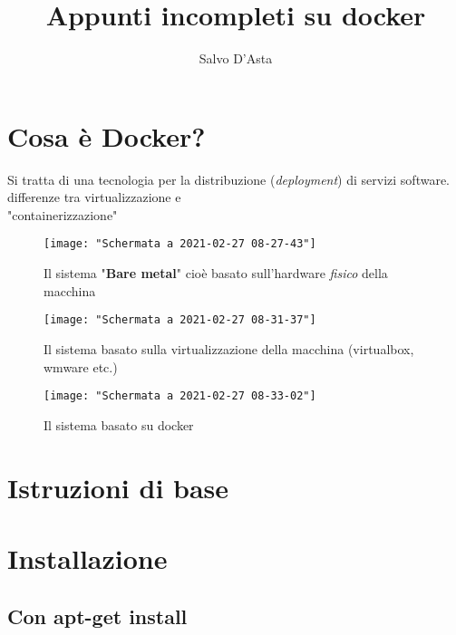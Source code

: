 \documentclass[10pt,a4paper]{report}
\author{Salvo D'Asta}
\title{Appunti incompleti su docker}
\begin{document}
	

	
	\maketitle
	
	


\tableofcontents
\section*{Cosa è Docker?}
Si tratta di una tecnologia per la distribuzione (\textit{deployment}) di servizi software.
differenze tra virtualizzazione e\\ "containerizzazione"
\begin{figure}[h]
	\centering
	\texttt{[image: "Schermata a 2021-02-27 08-27-43"]}
	\caption{Il sistema "\textbf{Bare metal}" cioè basato sull'hardware \textit{fisico} della macchina}
	\label{fig:schermata-a-2021-02-27-08-27-43}
\end{figure}
\begin{figure}[h]
	\centering
	\texttt{[image: "Schermata a 2021-02-27 08-31-37"]}
	\caption{Il sistema basato sulla virtualizzazione della macchina (virtualbox, wmware etc.)}
	\label{fig:schermata-a-2021-02-27-08-31-37}
\end{figure}
\begin{figure}[h]
	\centering
	\texttt{[image: "Schermata a 2021-02-27 08-33-02"]}
	\caption{Il sistema basato su docker}
	\label{fig:schermata-a-2021-02-27-08-33-02}
\end{figure}





\pagebreak
  
\section*{Istruzioni di base}	

	\section{Installazione}
	\subsection{Con apt-get install}
	
\end{document}

